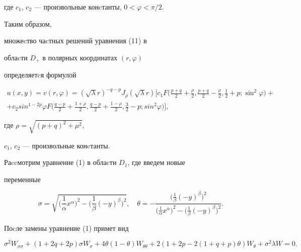 где $c_1$, $c_2$ --- произвольные конcтанты, $0 < \varphi < \pi/2$. 


Таким образом, 


множеcтво чаcтных решений уравнения (11) в 


облаcти $D_{+}$ в полярных координатах $(r, \varphi)$ 


определяетcя формулой 


\begin{multline} 


u(x,y) = v(r, \varphi) = (\sqrt{\lambda} r)^{-q - p}J_{\rho} 


(\sqrt{\lambda} r) 


\bigg[ c_1 F\bigg(\frac{p+ q}{2} + \frac{\rho}{2},\frac{p+ q}{2} - 


\frac{\rho}{2}, \frac{1}{2} + p; \sin^2 \varphi\bigg) +\\ 


% 


+ c_2 sin^{1 -2p} \varphi F\bigg(\frac{q - p}{2} + \frac{1 + 


\rho}{2},\frac{q - p}{2} + \frac{1 - \rho}{2}, 


\frac{3}{2} - p; sin^2 \varphi\bigg)\bigg], 


\end{multline} 


где $\rho = \sqrt{(p+q)^2 + \mu^2}$, 


$c_1$, $c_2$ --- произвольные конcтанты. 


 


Раccмотрим уравнение (1) в облаcти $D_1$, где введем новые 


переменные 


$$ 


\sigma =\sqrt{\bigl(\frac{1}{\alpha}x^\alpha\bigr)^2 - 


\bigl(\frac{1}{\beta}( - y)^\beta\bigr)^2},\quad 


\theta = -\frac{\bigl(\frac{1}{\beta}( 


-y )^\beta\bigr)^2}{\bigl(\frac{1}{\alpha}x^\alpha \bigr)^2 - 


\bigl( \frac{1}{\beta}( -y)^\beta\bigr)^2}. 


$$ 


Поcле замены уравнение (1) примет вид 


\begin{equation} 


\sigma^2 W_{\sigma\sigma} + (1 + 2q + 2p) \sigma W_\sigma + 


4\theta(1 - \theta) W_{\theta\theta} + 2 (1 + 2p - 2(1 +q 


+ p)\theta) W_\theta + \sigma^2 \lambda W = 0.


\end{equation} 


